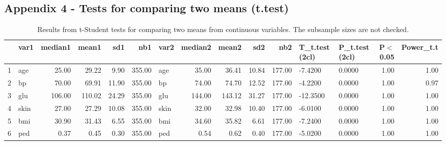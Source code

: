 \documentclass[12pt]{article}
\begin{document}
\begin{landscape}
\newpage
\section*{Appendix 4 - Tests for comparing two means (t.test)}
\begin{table}[ht]
\centering
\begin{tabular}{rlrrrrlrrrrllrr}
  \hline
 & var1 & median1 & mean1 & sd1 & nb1 & var2 & median2 & mean2 & sd2 & nb2 & T\_t.test (2cl) & P\_t.test (2cl) & P$<$0.05 & Power\_t.t \\ 
  \hline
1 & age & 25.00 & 29.22 & 9.90 & 355.00 & age & 35.00 & 36.41 & 10.84 & 177.00 & -7.4200 & 0.0000 & 1.00 & 1.00 \\ 
  2 & bp & 70.00 & 69.91 & 11.90 & 355.00 & bp & 74.00 & 74.70 & 12.52 & 177.00 & -4.2200 & 0.0000 & 1.00 & 0.97 \\ 
  3 & glu & 106.00 & 110.02 & 24.29 & 355.00 & glu & 144.00 & 143.12 & 31.27 & 177.00 & -12.3500 & 0.0000 & 1.00 & 1.00 \\ 
  4 & skin & 27.00 & 27.29 & 10.08 & 355.00 & skin & 32.00 & 32.98 & 10.40 & 177.00 & -6.0100 & 0.0000 & 1.00 & 1.00 \\ 
  5 & bmi & 30.90 & 31.43 & 6.55 & 355.00 & bmi & 34.60 & 35.82 & 6.61 & 177.00 & -7.2400 & 0.0000 & 1.00 & 1.00 \\ 
  6 & ped & 0.37 & 0.45 & 0.30 & 355.00 & ped & 0.54 & 0.62 & 0.40 & 177.00 & -5.0200 & 0.0000 & 1.00 & 1.00 \\ 
   \hline
\end{tabular}
\caption{Results from t-Student tests for comparing two means from continuous variables. The subsample sizes are not checked.} 
\label{tab:t.test}
\end{table}
\newpage

\end{landscape}
\end{document}
